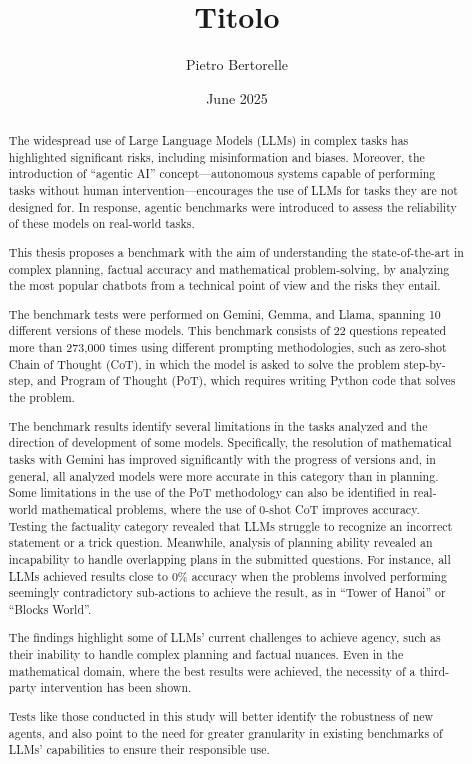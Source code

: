 \documentclass[12pt]{article}
\title{Titolo}
\author{Pietro Bertorelle}
\date{June 2025}
\begin{document}


\clearpage
\begin{abstract}
The widespread use of Large Language Models (LLMs) in complex tasks has highlighted significant risks, including misinformation and biases. Moreover, the introduction of ``agentic AI'' concept---autonomous systems capable of performing tasks without human intervention---encourages the use of LLMs for tasks they are not designed for. In response, agentic benchmarks were introduced to assess the reliability of these models on real-world tasks.

This thesis proposes a benchmark with the aim of understanding the state-of-the-art in complex planning, factual accuracy and mathematical problem-solving, by analyzing the most popular chatbots from a technical point of view and the risks they entail.

The benchmark tests were performed on Gemini, Gemma, and Llama, spanning 10 different versions of these models. This benchmark consists of 22 questions repeated more than 273,000 times using different prompting methodologies, such as zero-shot Chain of Thought (CoT), in which the model is asked to solve the problem step-by-step, and Program of Thought (PoT), which requires writing Python code that solves the problem.

The benchmark results identify several limitations in the tasks analyzed and the direction of development of some models. Specifically, the resolution of mathematical tasks with Gemini has improved significantly with the progress of versions and, in general, all analyzed models were more accurate in this category than in planning. Some limitations in the use of the PoT methodology can also be identified in real-world mathematical problems, where the use of 0-shot CoT improves accuracy.\\ 
Testing the factuality category revealed that LLMs struggle to recognize an incorrect statement or a trick question. Meanwhile, analysis of planning ability revealed an incapability to handle overlapping plans in the submitted questions. For instance, all LLMs achieved results close to 0\% accuracy when the problems involved performing seemingly contradictory sub-actions to achieve the result, as in ``Tower of Hanoi'' or ``Blocks World''.

The findings highlight some of LLMs' current challenges to achieve agency, such as their inability to handle complex planning and factual nuances. Even in the mathematical domain, where the best results were achieved, the necessity of a third-party intervention has been shown.

Tests like those conducted in this study will better identify the robustness of new agents, and also point to the need for greater granularity in existing benchmarks of LLMs' capabilities to ensure their responsible use.


\end{abstract}
\end{document}
